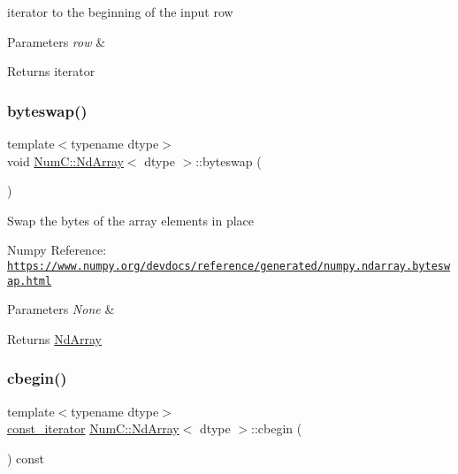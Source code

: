 iterator to the beginning of the input row


\begin{DoxyParams}{Parameters}
{\em row} & \\
\hline
\end{DoxyParams}
\begin{DoxyReturn}{Returns}
iterator 
\end{DoxyReturn}
\mbox{\label{class_num_c_1_1_nd_array_a847dd08abd0ccc23ee792ab503cf60c1}} 
\subsubsection{\texorpdfstring{byteswap()}{byteswap()}}
{\footnotesize\ttfamily template$<$typename dtype$>$ \\
void \mbox{\hyperlink{class_num_c_1_1_nd_array}{Num\+C\+::\+Nd\+Array}}$<$ dtype $>$\+::byteswap (\begin{DoxyParamCaption}{ }\end{DoxyParamCaption})\hspace{0.3cm}{\ttfamily [inline]}}

Swap the bytes of the array elements in place

Numpy Reference\+: \href{https://www.numpy.org/devdocs/reference/generated/numpy.ndarray.byteswap.html}{\tt https\+://www.\+numpy.\+org/devdocs/reference/generated/numpy.\+ndarray.\+byteswap.\+html}


\begin{DoxyParams}{Parameters}
{\em None} & \\
\hline
\end{DoxyParams}
\begin{DoxyReturn}{Returns}
\mbox{\hyperlink{class_num_c_1_1_nd_array}{Nd\+Array}} 
\end{DoxyReturn}
\mbox{\label{class_num_c_1_1_nd_array_ac80d7125ea62fcd159e40387c2389081}} 
\subsubsection{\texorpdfstring{cbegin()}{cbegin()}\hspace{0.1cm}{\footnotesize\ttfamily [1/2]}}
{\footnotesize\ttfamily template$<$typename dtype$>$ \\
\mbox{\hyperlink{class_num_c_1_1_nd_array_a445cec326684b0066bddae07ba06eddf}{const\+\_\+iterator}} \mbox{\hyperlink{class_num_c_1_1_nd_array}{Num\+C\+::\+Nd\+Array}}$<$ dtype $>$\+::cbegin (\begin{DoxyParamCaption}{ }\end{DoxyParamCaption}) const\hspace{0.3cm}{\ttfamily [inline]}}

